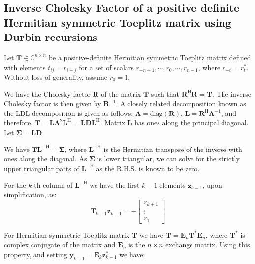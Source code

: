 \subsection{Inverse Cholesky Factor of a positive definite Hermitian symmetric Toeplitz matrix using Durbin recursions}
\label{sec:001_inverse}

Let $\boldsymbol{T} \in \mathbb{C}^{n \times n}$ be a positive-definite Hermitian symmetric Toeplitz matrix defined with elements $t_{ij} = r_{i-j}$ for a set of scalars $r_{-n+1}, \cdots, r_0, \cdots, r_{n-1}$, where $r_{-t} = r_t^*$. Without loss of generality, assume $r_0 = 1$.

We have the Cholesky factor $\boldsymbol{R}$ of the matrix $\boldsymbol{T}$ such that $\boldsymbol{R}^{\mathrm{H}} \boldsymbol{R} = \boldsymbol{T}$. The inverse Cholesky factor is then given by $\boldsymbol{R}^{-1}$. A closely related decomposition known as the LDL decomposition is given as follows: $\boldsymbol{\Lambda} = \text{diag}(\boldsymbol{R})$, $\boldsymbol{L} = \boldsymbol{R}^{\mathrm{H}} \boldsymbol{\Lambda}^{-1}$, and therefore, $\boldsymbol{T} = \boldsymbol{L} \boldsymbol{\Lambda}^2 \boldsymbol{L}^{\mathrm{H}} = \boldsymbol{L} \boldsymbol{D} \boldsymbol{L}^{\mathrm{H}}$. Matrix $\boldsymbol{L}$ has ones along the principal diagonal. Let $\boldsymbol{\Sigma} = \boldsymbol{L}\boldsymbol{D}$.

We have $\boldsymbol{T} \boldsymbol{L}^{-\mathrm{H}} = \boldsymbol{\Sigma}$, where $\boldsymbol{L}^{-\mathrm{H}}$ is the Hermitian transpose of the inverse with ones along the diagonal. As $\boldsymbol{\Sigma}$ is lower triangular, we can solve for the strictly upper triangular parts of $\boldsymbol{L}^{-\mathrm{H}}$ as the R.H.S. is known to be zero.

For the $k$-th column of $\boldsymbol{L}^{-\mathrm{H}}$ we have the first $k-1$ elements $\boldsymbol{z}_{k-1}$, upon simplification, as:
$$\boldsymbol{T}_{k-1} \boldsymbol{z}_{k-1} = - \begin{bmatrix} r_{k+1} \\ \vdots \\ r_1 \end{bmatrix}$$

For Hermitian symmetric Toeplitz matrix $\boldsymbol{T}$ we have $\boldsymbol{T} = \boldsymbol{E}_n \boldsymbol{T}^* \boldsymbol{E}_n$, where $\boldsymbol{T}^*$ is complex conjugate of the matrix and $\boldsymbol{E}_n$ is the $n \times n$ exchange matrix. Using this property, and setting $\boldsymbol{y}_{k-1} = \boldsymbol{E}_k \boldsymbol{z}^*_{k-1}$ we have:

